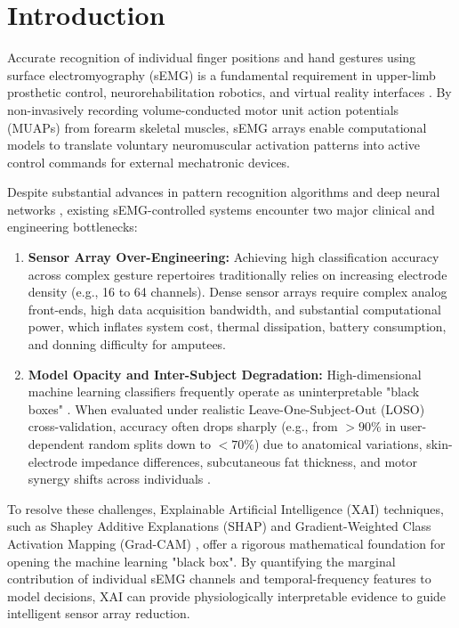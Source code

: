 \documentclass[10pt,twocolumn,letterpaper]{article}
\begin{document}
\section{Introduction}
Accurate recognition of individual finger positions and hand gestures using surface electromyography (sEMG) is a fundamental requirement in upper-limb prosthetic control, neurorehabilitation robotics, and virtual reality interfaces \cite{13,14,3}. By non-invasively recording volume-conducted motor unit action potentials (MUAPs) from forearm skeletal muscles, sEMG arrays enable computational models to translate voluntary neuromuscular activation patterns into active control commands for external mechatronic devices.

Despite substantial advances in pattern recognition algorithms and deep neural networks \cite{17,18}, existing sEMG-controlled systems encounter two major clinical and engineering bottlenecks:
\begin{enumerate}
    \item \textbf{Sensor Array Over-Engineering:} Achieving high classification accuracy across complex gesture repertoires traditionally relies on increasing electrode density (e.g., 16 to 64 channels). Dense sensor arrays require complex analog front-ends, high data acquisition bandwidth, and substantial computational power, which inflates system cost, thermal dissipation, battery consumption, and donning difficulty for amputees.
    \item \textbf{Model Opacity and Inter-Subject Degradation:} High-dimensional machine learning classifiers frequently operate as uninterpretable "black boxes" \cite{4,5}. When evaluated under realistic Leave-One-Subject-Out (LOSO) cross-validation, accuracy often drops sharply (e.g., from $>90\%$ in user-dependent random splits down to $<70\%$) due to anatomical variations, skin-electrode impedance differences, subcutaneous fat thickness, and motor synergy shifts across individuals \cite{s20030672}.
\end{enumerate}

To resolve these challenges, Explainable Artificial Intelligence (XAI) techniques, such as Shapley Additive Explanations (SHAP) \cite{8} and Gradient-Weighted Class Activation Mapping (Grad-CAM) \cite{9}, offer a rigorous mathematical foundation for opening the machine learning "black box". By quantifying the marginal contribution of individual sEMG channels and temporal-frequency features to model decisions, XAI can provide physiologically interpretable evidence to guide intelligent sensor array reduction.
\end{document}
